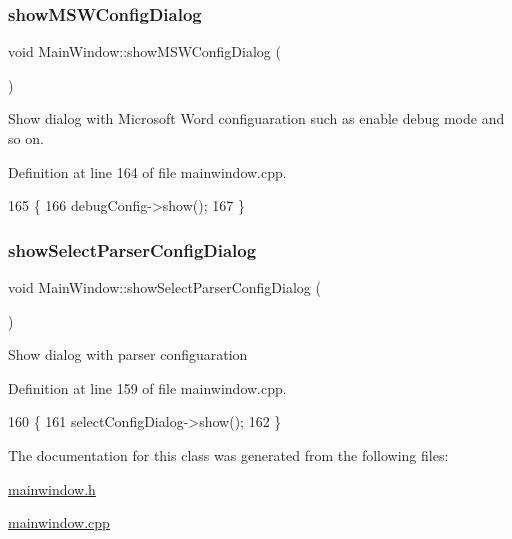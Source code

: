 \subsubsection{\texorpdfstring{show\+M\+S\+W\+Config\+Dialog}{showMSWConfigDialog}}
{\footnotesize\ttfamily void Main\+Window\+::show\+M\+S\+W\+Config\+Dialog (\begin{DoxyParamCaption}{ }\end{DoxyParamCaption})\hspace{0.3cm}{\ttfamily [slot]}}

Show dialog with Microsoft Word configuaration such as enable debug mode and so on. 

Definition at line 164 of file mainwindow.\+cpp.


\begin{DoxyCode}
165 \{
166     debugConfig->show();
167 \}
\end{DoxyCode}
\mbox{\label{class_main_window_ab8d462abbdc0627822672281f8e07d50}} 
\subsubsection{\texorpdfstring{show\+Select\+Parser\+Config\+Dialog}{showSelectParserConfigDialog}}
{\footnotesize\ttfamily void Main\+Window\+::show\+Select\+Parser\+Config\+Dialog (\begin{DoxyParamCaption}{ }\end{DoxyParamCaption})\hspace{0.3cm}{\ttfamily [slot]}}

Show dialog with parser configuaration 

Definition at line 159 of file mainwindow.\+cpp.


\begin{DoxyCode}
160 \{
161     selectConfigDialog->show();
162 \}
\end{DoxyCode}


The documentation for this class was generated from the following files\+:\begin{DoxyCompactItemize}
\item 
\hyperlink{mainwindow_8h}{mainwindow.\+h}\item 
\hyperlink{mainwindow_8cpp}{mainwindow.\+cpp}\end{DoxyCompactItemize}
